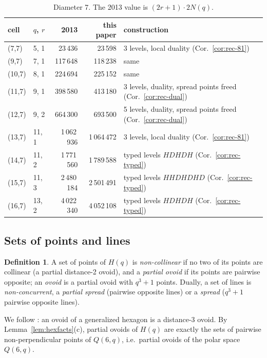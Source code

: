 \documentclass[11pt]{amsart}
\theoremstyle{definition}
\newtheorem{definition}[theorem]{Definition}
\theoremstyle{remark}
\numberwithin{equation}{section}
\begin{document}
\begin{table}[ht]
\caption{Diameter 7. The 2013 value is $(2r+1)\cdot2N(q)$.}\label{tab:d7}
\begin{tabular}{@{}l l r r l@{}}
\toprule cell & $q$, $r$ & 2013 & this paper & construction \\ \midrule
(7,7) & 5, 1 & 23\,436 & 23\,598 & 3 levels, local duality (Cor.~\ref{cor:rec-81}) \\
(9,7) & 7, 1 & 117\,648 & 118\,238 & same \\
(10,7) & 8, 1 & 224\,694 & 225\,152 & same \\
(11,7) & 9, 1 & 398\,580 & 413\,180 & 3 levels, duality, spread points freed (Cor.~\ref{cor:rec-dual}) \\
(12,7) & 9, 2 & 664\,300 & 693\,500 & 5 levels, duality, spread points freed (Cor.~\ref{cor:rec-dual}) \\
(13,7) & 11, 1 & 1\,062\,936 & 1\,064\,472 & 3 levels, local duality (Cor.~\ref{cor:rec-81}) \\
(14,7) & 11, 2 & 1\,771\,560 & 1\,789\,588 & typed levels $HDHDH$ (Cor.~\ref{cor:rec-typed}) \\
(15,7) & 11, 3 & 2\,480\,184 & 2\,501\,491 & typed levels $HHDHDHD$ (Cor.~\ref{cor:rec-typed}) \\
(16,7) & 13, 2 & 4\,022\,340 & 4\,052\,108 & typed levels $HDHDH$ (Cor.~\ref{cor:rec-typed}) \\
\bottomrule
\end{tabular}
\end{table}

\subsection{Sets of points and lines}

\begin{definition}\label{def:hexsets}
A set of points of $H(q)$ is \emph{non-collinear} if no two of its points are collinear (a partial distance-2 ovoid),
and a \emph{partial ovoid} if its points are pairwise opposite; an \emph{ovoid} is a partial ovoid with $q^3+1$ points.
Dually, a set of lines is \emph{non-concurrent}, a \emph{partial spread} (pairwise opposite lines) or a \emph{spread}
($q^3+1$ pairwise opposite lines).
\end{definition}

We follow \cite{VM98}: an ovoid of a generalized hexagon is a distance-3 ovoid. By
Lemma~\ref{lem:hexfacts}(c), partial ovoids of $H(q)$ are exactly the sets of pairwise non-perpendicular points of
$Q(6,q)$, i.e.\ partial ovoids of the polar space $Q(6,q)$.
\end{document}
